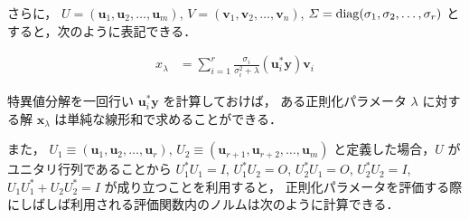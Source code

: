 さらに，
$U = (\bm{u}_1, \bm{u}_2, \ldots, \bm{u}_m)$,
$V = (\bm{v}_1, \bm{v}_2, \ldots, \bm{v}_n)$,
$\varSigma = \operatorname{diag}(\sigma_1, \sigma_2, \ldots, \sigma_r)$
とすると，次のように表記できる．

\begin{align}
    x_{\lambda}
     & = \sum_{i = 1}^{r} \frac{\sigma_i}{\sigma_i^2 + \lambda} (\bm{u}_i^* \bm{y}) \bm{v}_i
\end{align}

特異値分解を一回行い
$\bm{u}_i^* \bm{y}$
を計算しておけば，
ある正則化パラメータ $\lambda$ に対する解 $\bm{x}_{\lambda}$ は単純な線形和で求めることができる．

また，
$U_1 \equiv (\bm{u}_1, \bm{u}_2, \ldots, \bm{u}_r)$,
$U_2 \equiv (\bm{u}_{r+1}, \bm{u}_{r+2}, \ldots, \bm{u}_m)$
と定義した場合，$U$ がユニタリ行列であることから
$U_1^* U_1 = I$,
$U_1^* U_2 = O$,
$U_2^* U_1 = O$,
$U_2^* U_2 = I$,
$U_1 U_1^* + U_2 U_2^* = I$
が成り立つことを利用すると，
正則化パラメータを評価する際にしばしば利用される評価関数内のノルムは次のように計算できる．

